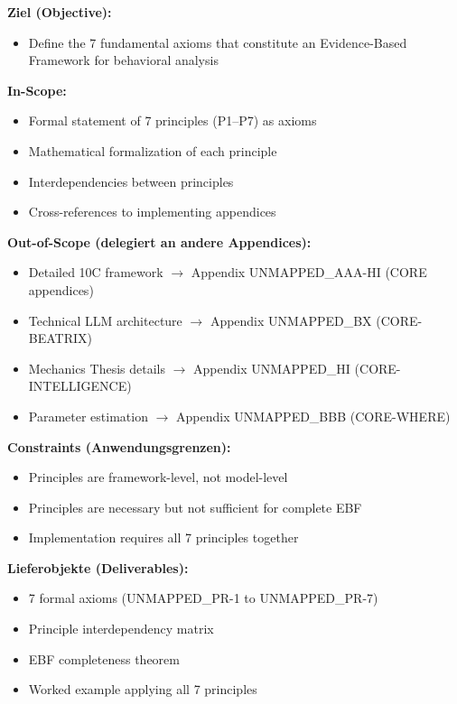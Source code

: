 \begin{tcolorbox}[
    colback=orange!5!white,
    colframe=orange!75!black,
    title={\textbf{Appendix Scope: Ziel / In-Scope / Out-of-Scope / Constraints}},
    fonttitle=\bfseries
]

\textbf{Ziel (Objective):}
\begin{itemize}[nosep]
    \item Define the 7 fundamental axioms that constitute an Evidence-Based Framework for behavioral analysis
\end{itemize}

\textbf{In-Scope:}
\begin{itemize}[nosep]
    \item Formal statement of 7 principles (P1--P7) as axioms
    \item Mathematical formalization of each principle
    \item Interdependencies between principles
    \item Cross-references to implementing appendices
\end{itemize}

\textbf{Out-of-Scope (delegiert an andere Appendices):}
\begin{itemize}[nosep]
    \item Detailed 10C framework $\rightarrow$ Appendix UNMAPPED_AAA-HI (CORE appendices)
    \item Technical LLM architecture $\rightarrow$ Appendix UNMAPPED_BX (CORE-BEATRIX)
    \item Mechanics Thesis details $\rightarrow$ Appendix UNMAPPED_HI (CORE-INTELLIGENCE)
    \item Parameter estimation $\rightarrow$ Appendix UNMAPPED_BBB (CORE-WHERE)
\end{itemize}

\textbf{Constraints (Anwendungsgrenzen):}
\begin{itemize}[nosep]
    \item Principles are framework-level, not model-level
    \item Principles are necessary but not sufficient for complete EBF
    \item Implementation requires all 7 principles together
\end{itemize}

\textbf{Lieferobjekte (Deliverables):}
\begin{itemize}[nosep]
    \item 7 formal axioms (UNMAPPED_PR-1 to UNMAPPED_PR-7)
    \item Principle interdependency matrix
    \item EBF completeness theorem
    \item Worked example applying all 7 principles
\end{itemize}

\end{tcolorbox}


